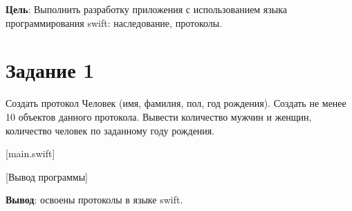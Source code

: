 \documentclass{bsuir}
\begin{document}
\maketitle
\mainmatter
\renewcommand{\thefigure}{\arabic{figure}}
\renewcommand{\thelisting}{\arabic{listing}}

\textbf{Цель}: Выполнить разработку приложения с использованием языка
программирования swift: наследование, протоколы.

\section*{Задание 1}

Создать протокол Человек (имя, фамилия, пол, год рождения). Создать не менее 10
объектов данного протокола. Вывести количество мужчин и женщин, количество
человек по заданному году рождения.

[main.swift]

[Вывод программы]

\textbf{Вывод}: освоены протоколы в языке swift.
\end{document}
